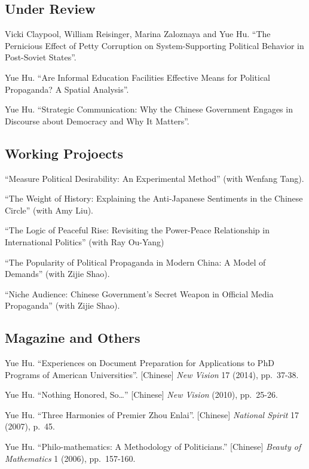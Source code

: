 \documentclass[10.5pt,]{article}
\begin{document}
\subsection{Under Review}\label{under-review}

Vicki Claypool, William Reisinger, Marina Zaloznaya and Yue Hu. ``The
Pernicious Effect of Petty Corruption on System-Supporting Political
Behavior in Post-Soviet States''.

Yue Hu. ``Are Informal Education Facilities Effective Means for
Political Propaganda? A Spatial Analysis''.

Yue Hu. ``Strategic Communication: Why the Chinese Government Engages in
Discourse about Democracy and Why It Matters''.

\subsection{Working Projoects}\label{working-projoects}

``Measure Political Desirability: An Experimental Method'' (with Wenfang
Tang).

``The Weight of History: Explaining the Anti-Japanese Sentiments in the
Chinese Circle'' (with Amy Liu).

``The Logic of Peaceful Rise: Revisiting the Power-Peace Relationship in
International Politics'' (with Ray Ou-Yang)

``The Popularity of Political Propaganda in Modern China: A Model of
Demands'' (with Zijie Shao).

``Niche Audience: Chinese Government's Secret Weapon in Official Media
Propaganda'' (with Zijie Shao).

\subsection{Magazine and Others}\label{magazine-and-others}

Yue Hu. ``Experiences on Document Preparation for Applications to PhD
Programs of American Universities''. {[}Chinese{]} \emph{New Vision} 17
(2014), pp.~37-38.

Yue Hu. ``Nothing Honored, So\ldots{}'' {[}Chinese{]} \emph{New Vision}
(2010), pp.~25-26.

Yue Hu. ``Three Harmonies of Premier Zhou Enlai''. {[}Chinese{]}
\emph{National Spirit} 17 (2007), p.~45.

Yue Hu. ``Philo-mathematics: A Methodology of Politicians.''
{[}Chinese{]} \emph{Beauty of Mathematics} 1 (2006), pp.~157-160.
\end{document}
